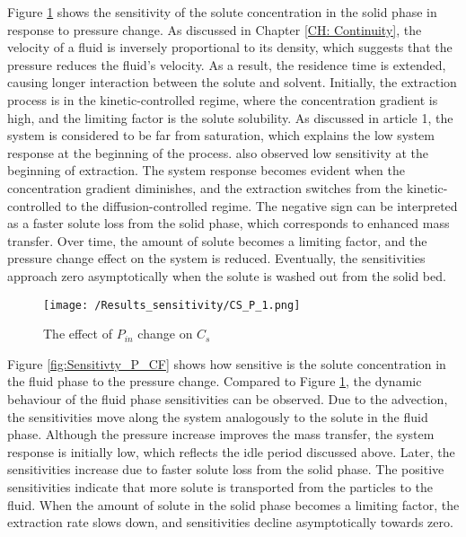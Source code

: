 \documentclass[../Article_Sensitivity_Analsysis.tex]{subfiles}
\begin{document}
	Figure \ref{fig:Sensitivty_P_CS} shows the sensitivity of the solute concentration in the solid phase in response to pressure change. As discussed in Chapter \ref{CH: Continuity}, the velocity of a fluid is inversely proportional to its density, which suggests that the pressure reduces the fluid's velocity. As a result, the residence time is extended, causing longer interaction between the solute and solvent. Initially, the extraction process is in the kinetic-controlled regime, where the concentration gradient is high, and the limiting factor is the solute solubility. As discussed in {\color{red}article 1}, the system is considered to be far from saturation, which explains the low system response at the beginning of the process. \citet{Fiori_2007} also observed low sensitivity at the beginning of extraction. The system response becomes evident when the concentration gradient diminishes, and the extraction switches from the kinetic-controlled to the diffusion-controlled regime. The negative sign can be interpreted as a faster solute loss from the solid phase, which corresponds to enhanced mass transfer. Over time, the amount of solute becomes a limiting factor, and the pressure change effect on the system is reduced. Eventually, the sensitivities approach zero asymptotically when the solute is washed out from the solid bed.

	\begin{figure}[!ht]
		\centering
		\texttt{[image: /Results\_sensitivity/CS\_P\_1.png]}
		\caption{The effect of $P_{in}$ change on $C_s$}
		\label{fig:Sensitivty_P_CS}
	\end{figure}
	
	Figure \ref{fig:Sensitivty_P_CF} shows how sensitive is the solute concentration in the fluid phase to the pressure change. Compared to Figure \ref{fig:Sensitivty_P_CS}, the dynamic behaviour of the fluid phase sensitivities can be observed. Due to the advection, the sensitivities move along the system analogously to the solute in the fluid phase. Although the pressure increase improves the mass transfer, the system response is initially low, which reflects the idle period discussed above. Later, the sensitivities increase due to faster solute loss from the solid phase. The positive sensitivities indicate that more solute is transported from the particles to the fluid. When the amount of solute in the solid phase becomes a limiting factor, the extraction rate slows down, and sensitivities decline asymptotically towards zero.
	
\end{document}
